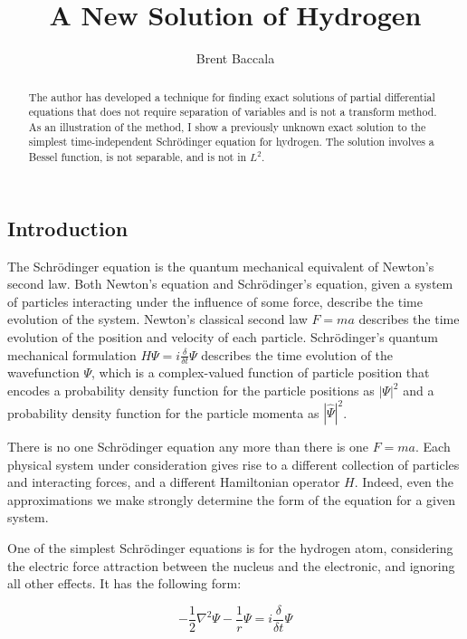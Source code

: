 \documentclass{article}
\title{A New Solution of Hydrogen}
\author{Brent Baccala}
\begin{document}
\parindent 0pt

\maketitle

\begin{abstract}
The author has developed a technique for finding exact solutions of partial
differential equations that does not require separation of variables
and is not a transform method.  As an illustration of the method,
I show a previously unknown exact solution to the simplest time-independent Schr\"odinger equation for hydrogen.
The solution involves a Bessel function, is not separable, and is not in $L^2$.
\end{abstract}

\subsection*{Introduction}
\parskip 12pt

The Schr\"odinger equation is the quantum mechanical equivalent of Newton's second law.
Both Newton's equation and Schr\"odinger's equation,
given a system of particles interacting under the influence of some force,
describe the time evolution of the system.  Newton's classical second law $F=ma$
describes the time evolution of the position and velocity of each particle.
Schr\"odinger's quantum mechanical formulation $H\Psi=i\frac{\delta}{\delta t} \Psi$
describes the time evolution
of the wavefunction $\Psi$, which is a complex-valued function of particle position
that encodes a probability density function for
the particle positions as $|\Psi|^2$ and a probability density function
for the particle momenta as $|\hat{\Psi}|^2$.

There is no one Schr\"odinger equation any more than there is one $F=ma$.
Each physical system under consideration gives rise to a different collection
of particles and interacting forces, and a different Hamiltonian operator $H$.
Indeed, even the approximations we
make strongly determine the form of the equation for a given system.

One of the simplest Schr\"odinger equations is for the hydrogen atom,
considering the electric force attraction between the nucleus and
the electronic, and ignoring all other effects.  It has the following form:

\begin{equation*}
-\frac{1}{2}\nabla^2 \Psi - \frac{1}{r}\Psi = i \frac{\delta}{\delta t} \Psi
\end{equation*}
\end{document}
